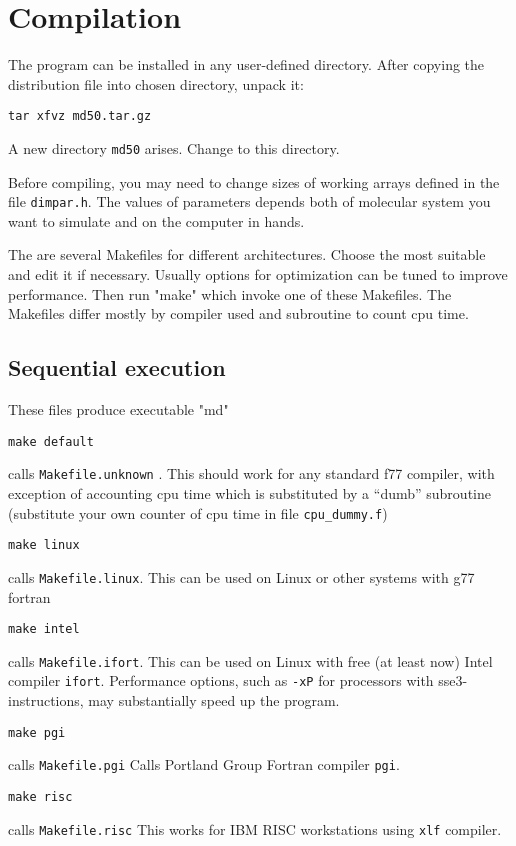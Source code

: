 \documentclass{article}
\begin{document}
\section{Compilation}

The program can be installed in any user-defined directory. After
copying the distribution file into chosen directory, unpack it:

\verb|tar xfvz md50.tar.gz|

A new directory \verb|md50| arises. Change to this directory.

Before compiling, you may need to change sizes of working arrays defined
in the file \verb|dimpar.h|. The values of parameters depends both
of molecular system you want to simulate and on the computer in hands.

The are several Makefiles for different architectures. Choose the most
suitable and edit it if necessary. Usually options for optimization
can be tuned to improve performance. Then run "make" which invoke one of 
these Makefiles. The Makefiles differ mostly by compiler used and 
subroutine to count cpu time.

\subsection{Sequential execution} 

These files produce executable "md"

\verb|make default| 

calls \verb|Makefile.unknown| .  This should work for any standard f77 
compiler, with exception of accounting cpu time which is substituted by 
a ``dumb'' subroutine (substitute your own counter of cpu time in file 
\verb|cpu_dummy.f|)

\verb|make linux|

calls  \verb|Makefile.linux|. This can be  used  on Linux or other systems 
with g77 fortran  

\verb|make intel|

calls  \verb|Makefile.ifort|. This can be  used  on Linux with free (at 
least now) Intel compiler \verb|ifort|. Performance options, such as 
\verb|-xP| for processors with sse3-instructions, may substantially 
speed up the program.

\verb|make pgi|

calls \verb|Makefile.pgi|  Calls Portland Group Fortran compiler \verb|pgi|.
   

\verb|make risc|

calls \verb|Makefile.risc|   This works for IBM RISC workstations using
\verb|xlf| compiler.
\end{document}
